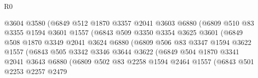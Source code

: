 \begin{lexlean}{R0}
\begin{coremodule}
                            @3604
                            @3580
                            (@6849
                              @512
                              @1870
                              @3357
                              @2041
                              @3603
                              @6880
                              (@6809
                                @510
                                @83
                                @3355
                                @1594
                                @3601
                                @1557
                                (@6843
                                  @509
                                  @3350
                                  @3354
                                  @3625
                                  @3601
                                  (@6849
                                    @508
                                    @1870
                                    @3349
                                    @2041
                                    @3624
                                    @6880
                                    (@6809
                                      @506
                                      @83
                                      @3347
                                      @1594
                                      @3622
                                      @1557
                                      (@6843
                                        @505
                                        @3342
                                        @3346
                                        @3644
                                        @3622
                                        (@6849
                                          @504
                                          @1870
                                          @3341
                                          @2041
                                          @3643
                                          @6880
                                          (@6809
                                            @502
                                            @83
                                            @2258
                                            @1594
                                            @2464
                                            @1557
                                            (@6843
                                              @501
                                              @2253
                                              @2257
                                              @2479

\end{coremodule}
\end{lexlean}
